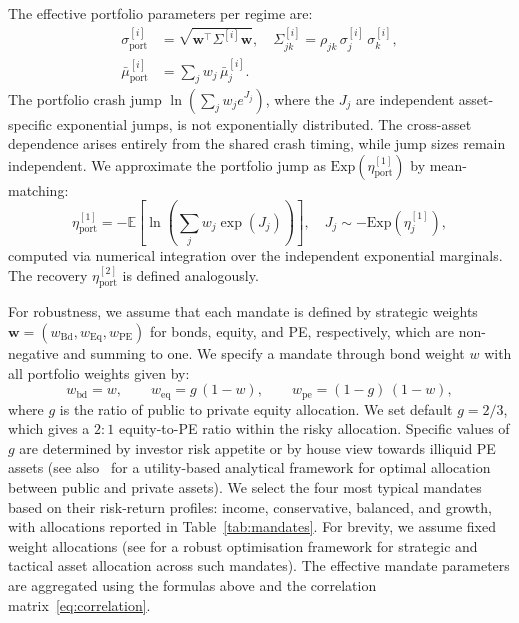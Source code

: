 \documentclass[11pt,a4paper]{article}
\numberwithin{equation}{section}
\newcommand{\E}{\mathbb{E}}
\begin{document}
The effective portfolio parameters per regime are:
\begin{align}
\sigma^{[i]}_{\mathrm{port}} &= \sqrt{\bm{w}^\top \Sigma^{[i]} \bm{w}}, 
  \quad \Sigma^{[i]}_{jk} = \rho_{jk}\,\sigma^{[i]}_j\,\sigma^{[i]}_k, 
  \label{eq:sigma_port}\\
\bar{\mu}^{[i]}_{\mathrm{port}} &= \sum_j w_j\,\bar{\mu}^{[i]}_j. 
  \label{eq:mu_port}
\end{align}
The portfolio crash jump $\ln(\sum_j w_j e^{J_j})$, where the $J_j$ are 
independent asset-specific exponential jumps, is not exponentially 
distributed. The cross-asset dependence arises entirely from the shared 
crash timing, while jump sizes remain independent. We approximate 
the portfolio jump as $\mathrm{Exp}(\eta^{[1]}_{\mathrm{port}})$ by 
mean-matching:
\begin{equation}\label{eq:eta_port}
\eta^{[1]}_{\mathrm{port}} = -\E\!\left[\ln\!\left(\sum_j w_j 
  \exp(J_j)\right)\right], \quad J_j \sim -\mathrm{Exp}(\eta^{[1]}_j),
\end{equation}
computed via numerical integration over the independent exponential 
marginals. The recovery $\eta^{[2]}_{\mathrm{port}}$ is defined analogously. 

For robustness, we assume that each mandate is defined by strategic weights 
$\bm{w} = (w_{\mathrm{Bd}}, w_{\mathrm{Eq}}, w_{\mathrm{PE}})$ for 
bonds, equity, and PE, respectively, which are non-negative and summing to one. 
We specify a mandate through bond weight $w$ with all portfolio weights 
given by:
\begin{equation}\label{eq:weight_curve}
w_{\mathrm{bd}} = w, \qquad w_{\mathrm{eq}} = g\,(1 - w), \qquad 
w_{\mathrm{pe}} = (1 - g)\,(1 - w),
\end{equation}
where $g$ is the ratio of public to private equity allocation. We set 
default $g = 2/3$, which gives a $2{:}1$ equity-to-PE ratio within the 
risky allocation. Specific values of $g$ are determined by investor risk 
appetite or by house view towards illiquid PE assets (see 
also~\citet{LiptonPrado2026} for a utility-based analytical framework for 
optimal allocation between public and private assets). We select the four most typical mandates based on their risk-return 
profiles: income, conservative, balanced, and growth, with allocations 
reported in Table~\ref{tab:mandates}. For brevity, we assume fixed weight allocations (see \citet{SeppOssaKastenholz2026} for a robust optimisation framework for strategic and tactical asset allocation across such mandates). The effective mandate 
parameters are aggregated using the formulas above and the correlation 
matrix~\eqref{eq:correlation}. 
\end{document}
